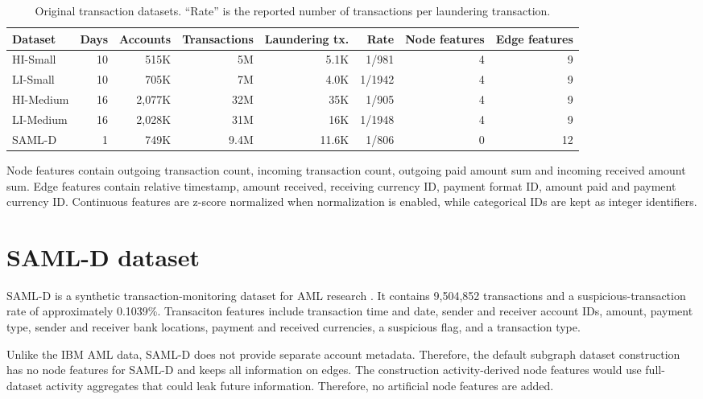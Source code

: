 \documentclass[12pt, twocolumn]{report}
\begin{document}
\begin{table}[t]
    \centering
    \caption{Original transaction datasets. ``Rate'' is the reported number of transactions per laundering transaction.}
    \label{tab:ibm-original-stats}
    \footnotesize
    \begin{tabular}{lrrrrrrr}
        \hline
        Dataset & Days & Accounts & Transactions & Laundering tx. & Rate & Node features  & Edge features \\
        \hline
        HI-Small  & 10 & 515K   & 5M   & 5.1K & 1/981 & 4 & 9 \\
        LI-Small  & 10 & 705K   & 7M   & 4.0K & 1/1942 & 4 & 9 \\
        HI-Medium & 16 & 2,077K & 32M  & 35K  & 1/905 & 4 & 9 \\
        LI-Medium & 16 & 2,028K & 31M  & 16K  & 1/1948 & 4 & 9 \\
        SAML-D & 1 & 749K & 9.4M & 11.6K & 1/806 & 0 & 12 \\
        \hline
    \end{tabular}
\end{table}

Node features contain outgoing transaction count, incoming transaction count, outgoing paid amount sum and incoming received amount sum. Edge features contain relative timestamp, amount received, receiving currency ID, payment format ID, amount paid and payment currency ID. Continuous features are z-score normalized when normalization is enabled, while categorical IDs are kept as integer identifiers.

\section{SAML-D dataset}

SAML-D is a synthetic transaction-monitoring dataset for AML research \cite{oztas2023enhancing,oztas2024samldkaggle}. It contains 9,504,852 transactions and a suspicious-transaction rate of approximately 0.1039\%. Transaciton features include transaction time and date, sender and receiver account IDs, amount, payment type, sender and receiver bank locations, payment and received currencies, a suspicious flag, and a transaction type. 

Unlike the IBM AML data, SAML-D does not provide separate account metadata. Therefore, the default subgraph dataset construction has no node features for SAML-D and keeps all information on edges. The construction activity-derived node features would use full-dataset activity aggregates that could leak future information. Therefore, no artificial node features are added.
\end{document}

